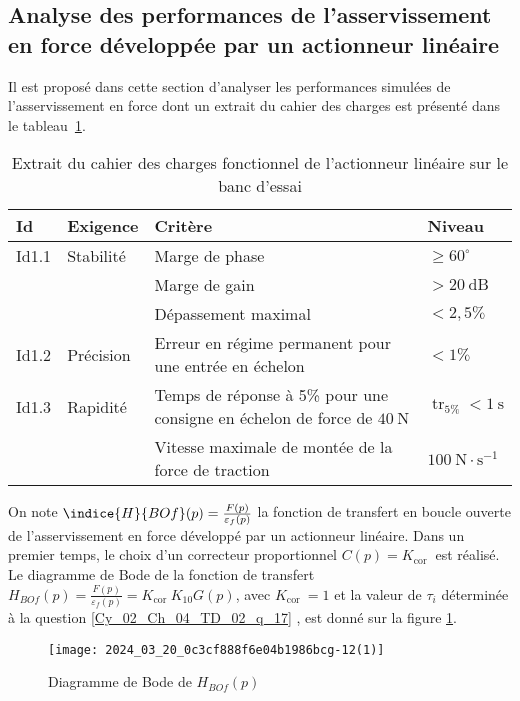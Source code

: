 \subsection*{Analyse des performances de l'asservissement en force développée par un actionneur linéaire}
\ifprof
\else
Il est proposé dans cette section d'analyser les performances simulées de l'asservissement en force dont un extrait du cahier des charges est présenté dans le tableau~\ref{Cy_02_Ch_04_TD_02_tab_05}.

\begin{table}[!h]
\begin{tabular}{llp{7cm}l}
\hline
\textbf{Id} & \textbf{Exigence} & \textbf{Critère} & \textbf{Niveau} \\
\hline
Id1.1 & Stabilité & Marge de phase & $\geqslant 60^{\circ}$ \\
 &  & Marge de gain & $>20 \mathrm{~dB}$ \\
 &  & Dépassement maximal & $<2,5 \%$ \\
Id1.2 & Précision & Erreur en régime permanent pour une entrée en échelon & $<1 \%$ \\
Id1.3 & Rapidité & Temps de réponse à 5\% pour une consigne en échelon de force de $40 \mathrm{~N}$ & $\operatorname{tr}_{5 \%}<1 \mathrm{~s}$ \\
 &  & Vitesse maximale de montée de la force de traction & $100 \mathrm{~N} \cdot \mathrm{s}^{-1}$ \\
\hline
\end{tabular}
\caption{Extrait du cahier des charges fonctionnel de l'actionneur linéaire sur le banc d'essai \label{Cy_02_Ch_04_TD_02_tab_05}}
\end{table}

On note $\indice{H}{BO f}(p)=\frac{F(p)}{\varepsilon_{f}(p)}$ la fonction de transfert en boucle ouverte de l'asservissement en force développé par un actionneur linéaire. Dans un premier temps, le choix d'un correcteur proportionnel $C(p)=K_{\text {cor }}$ est réalisé. Le diagramme de Bode de la fonction de transfert $H_{B O f}(p)=\frac{F(p)}{\varepsilon_{f}(p)}=K_{\text {cor }} K_{10} G(p)$, avec $K_{\text {cor }}=1$ et la valeur de $\tau_{i}$ déterminée à la question \ref{Cy_02_Ch_04_TD_02_q_17} , est donné sur la figure \ref{Cy_02_Ch_04_TD_02_fig_16}.\\


\begin{figure}[!h]
\texttt{[image: 2024\_03\_20\_0c3cf888f6e04b1986bcg-12(1)]}
\caption{Diagramme de Bode de $H_{B O f}(p)$  \label{Cy_02_Ch_04_TD_02_fig_16}}
\end{figure}

